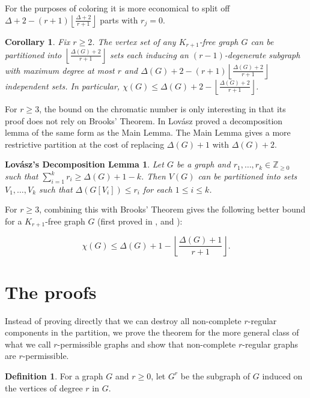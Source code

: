 \documentclass[12pt]{article}
\theoremstyle{plain}
\newtheorem{cor}[thm]{Corollary}
\newtheorem*{LovaszLemma}{Lov\'{a}sz's Decomposition Lemma}
\theoremstyle{definition}
\newtheorem{defn}{Definition}
\theoremstyle{remark}
\begin{document}
\noindent For the purposes of coloring it is more economical to split off $\Delta + 2 - (r+1)\left \lfloor \frac{\Delta + 2}{r + 1} \right \rfloor$ parts with $r_j = 0$.

\begin{cor}
Fix $r \geq 2$.  The vertex set of any $K_{r + 1}$-free graph $G$ can be partitioned into $\left \lfloor \frac{\Delta(G) + 2}{r + 1} \right \rfloor$ sets each inducing an $(r-1)$-degenerate subgraph with maximum degree at most $r$ and $\Delta(G) + 2 - (r+1)\left \lfloor \frac{\Delta(G) + 2}{r + 1} \right \rfloor$ independent sets.  In particular, $\chi(G) \leq \Delta(G) + 2 - \left \lfloor \frac{\Delta(G) + 2}{r + 1} \right \rfloor$.
\end{cor}

For $r \geq 3$, the bound on the chromatic number is only interesting in that its proof does not rely on Brooks' Theorem.  In \cite{Lovasz} Lov\'{a}sz proved a decomposition lemma of the same form as the Main Lemma.  The Main Lemma gives a more restrictive partition at the cost of replacing $\Delta(G) + 1$ with $\Delta(G) + 2$.

\begin{LovaszLemma}
Let $G$ be a graph and $r_1, \ldots, r_k \in \mathbb{Z}_{\geq 0}$ such that $\sum_{i=1}^k r_i \geq \Delta(G) + 1 - k$. Then $V(G)$ can be partitioned into sets $V_1, \ldots, V_k$ such that $\Delta(G[V_i]) \leq r_i$ for each $1 \leq i \leq k$.
\end{LovaszLemma}

\noindent For $r \geq 3$, combining this with Brooks' Theorem gives the following better bound for a $K_{r + 1}$-free graph $G$ (first proved in \cite{BK}, \cite{CatlinFirst} and \cite{Lawrence}):

\[\chi(G) \leq \Delta(G) + 1 - \left \lfloor \frac{\Delta(G) + 1}{r + 1} \right \rfloor.\]

\section{The proofs}
Instead of proving directly that we can destroy all non-complete $r$-regular components in the partition, we prove the theorem for the more general class of what we call $r$-permissible graphs and show that non-complete $r$-regular graphs are $r$-permissible.

\begin{defn}
For a graph $G$ and $r \geq 0$, let $G^r$ be the subgraph of $G$ induced on the vertices of degree $r$ in $G$.
\end{defn}
\end{document}
